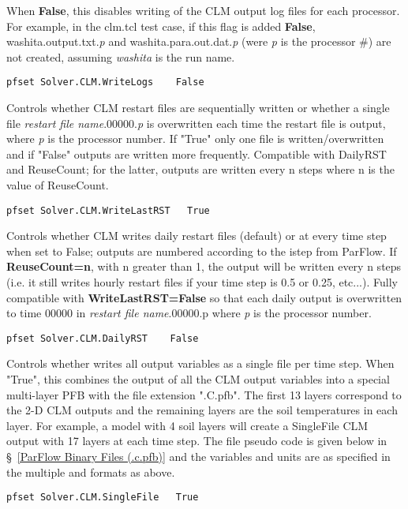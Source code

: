 {When {\bf False}, this disables writing of the CLM output log files for each processor. 
For example, in the clm.tcl test case, if this flag is added {\bf False}, 
washita.output.txt.\emph{p} and washita.para.out.dat.\emph{p} (were \emph{p} is the processor \#)
are not created, assuming \emph{washita} is the run name.} 
\begin{display}\begin{verbatim}
pfset Solver.CLM.WriteLogs    False
\end{verbatim}\end{display}

{Controls whether CLM restart files are sequentially written or whether a single
file \emph{restart file name}.00000.\emph{p} is overwritten each time the restart file is output,
where \emph{p} is the processor number. If "True" only one file is written/overwritten and if 
"False" outputs are written more frequently. Compatible with DailyRST and ReuseCount;
for the latter, outputs are written every n steps where n is the value of ReuseCount.} 
\begin{display}\begin{verbatim}
pfset Solver.CLM.WriteLastRST   True
\end{verbatim}\end{display}

{Controls whether CLM writes daily restart files (default) or at every time step when set 
to False; outputs are numbered according to the istep from ParFlow. If {\bf ReuseCount=n}, 
with n greater than 1, the output will be written every n steps (i.e. it still writes hourly 
restart files if your time step is 0.5 or 0.25, etc...). Fully compatible with {\bf WriteLastRST=False}
so that each daily output is overwritten to time 00000 in \emph{restart file name}.00000.p 
where \emph{p} is the processor number.} 
\begin{display}\begin{verbatim}
pfset Solver.CLM.DailyRST    False
\end{verbatim}\end{display}

{Controls whether \parflow{} writes all  output variables as a single file per time step.
When "True", this combines the output of all the CLM output variables into a special multi-layer 
PFB with the file extension ".C.pfb". The first 13 layers correspond to the 2-D CLM
outputs and the remaining layers are the soil temperatures in each layer. For example, 
a model with 4 soil layers will create a SingleFile CLM output with 17 layers at each time step. The
file pseudo code is given below in \S~\ref{ParFlow Binary Files (.c.pfb)} and the variables and units
are as specified in the multiple  and  formats as above.} 
\begin{display}\begin{verbatim}
pfset Solver.CLM.SingleFile   True
\end{verbatim}\end{display}

